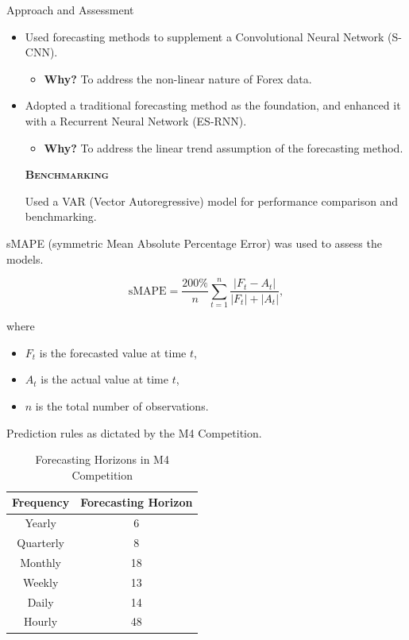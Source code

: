 \documentclass[aspectratio=169, 12pt]{beamer}
\begin{document}
\begin{frame}[allowframebreaks]{Approach and Assessment}

\begin{itemize}
        \item Used forecasting methods to supplement a Convolutional Neural Network (S-CNN).
        \begin{itemize}
            \item \textbf{Why?} To address the non-linear nature of Forex data.
        \end{itemize}
        \item Adopted a traditional forecasting method as the foundation, and enhanced it with a Recurrent Neural Network (ES-RNN).
        \begin{itemize}
            \item \textbf{Why?} To address the linear trend assumption of the forecasting method\cite{ayitey}.
        \end{itemize}

\begin{center}
    \textsc{\textbf{Benchmarking}}
\end{center}
        
Used a VAR (Vector Autoregressive) model for performance comparison and benchmarking.
\end{itemize}

sMAPE (symmetric Mean Absolute Percentage Error) was used to assess the models.

\begin{equation*}
\text{sMAPE} = \frac{200\%}{n} \sum_{t=1}^n \frac{|F_t - A_t|}{|F_t| + |A_t|},
\end{equation*}

where 
\begin{itemize}
    \item $F_t$ is the forecasted value at time $t$,
    \item $A_t$ is the actual value at time $t$,
    \item $n$ is the total number of observations.
\end{itemize}

Prediction rules as dictated by the M4 Competition\cite{m4}.

\begin{table}[h]
\centering
\caption{Forecasting Horizons in M4 Competition\cite{m4}}\label{tab:m4_horizons}
\begin{tabular}{cc}
\toprule
\textbf{Frequency} & \textbf{Forecasting Horizon} \\
\midrule
Yearly & 6 \\
Quarterly & 8 \\
Monthly & 18 \\
Weekly & 13 \\
Daily & 14 \\
Hourly & 48 \\
\bottomrule
\end{tabular}
\end{table}


\end{frame}
\end{document}
